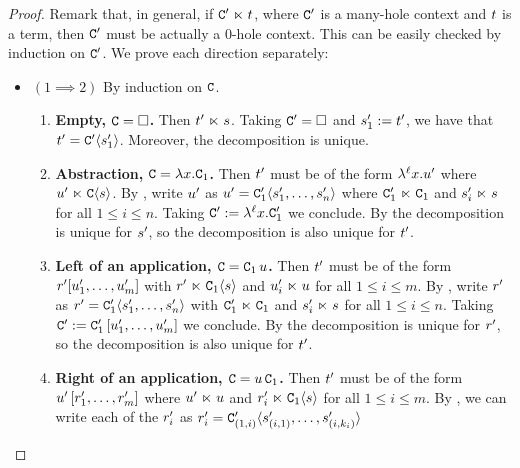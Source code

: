 \begin{proof}
Remark that, in general, if $\mathtt{C}' \mathrel{\ltimes} t$, where $\mathtt{C}'$ is a many-hole context and $t$ is a term,
then $\mathtt{C}'$ must be actually a $0$-hole context. This can be easily checked by induction on $\mathtt{C}'$.
We prove each direction separately:
\begin{itemize}
\item $(1 \implies 2)$
  By induction on $\mathtt{C}$.
  \begin{enumerate}
  \item {\bf Empty, $\mathtt{C} = \Box$.}
    Then $t' \mathrel{\ltimes} s$.
    Taking $\mathtt{C}' = \Box$ and $s'_1 := t'$,
    we have that $t' = \mathtt{C}'\langle s'_1\rangle$.
    Moreover, the decomposition is unique.
  \item {\bf Abstraction, $\mathtt{C} = \lambda x. \mathtt{C}_1$.}
    Then $t'$ must be of the form $\lambda^{\ell} x. u'$
    where $u' \mathrel{\ltimes} \mathtt{C}\langle s\rangle$.
    By \ih, write $u'$ as $u' = \mathtt{C}'_1\langle s'_1,\hdots,s'_n\rangle$
    where $\mathtt{C}'_1 \mathrel{\ltimes} \mathtt{C}_1$ and $s'_i \mathrel{\ltimes} s$ for all $1 \leq i \leq n$.
    Taking $\mathtt{C}' := \lambda^{\ell} x. \mathtt{C}'_1$ we conclude.
    By \ih the decomposition is unique for $s'$, so the decomposition is also unique for $t'$.
  \item {\bf Left of an application, $\mathtt{C} = \mathtt{C}_1\,u$.}
    Then $t'$ must be of the form $r'[u'_1,\hdots,u'_m]$
    with $r' \mathrel{\ltimes} \mathtt{C}_1\langle s\rangle$
    and $u'_i \mathrel{\ltimes} u$ for all $1 \leq i \leq m$.
    By \ih, write $r'$ as $r' = \mathtt{C}'_1\langle s'_1,\hdots,s'_n\rangle$
    with $\mathtt{C}'_1 \mathrel{\ltimes} \mathtt{C}_1$ and $s'_i \mathrel{\ltimes} s$ for all $1 \leq i \leq n$.
    Taking $\mathtt{C}' := \mathtt{C}'_1\,[u'_1,\hdots,u'_m]$ we conclude.
    By \ih the decomposition is unique for $r'$, so the decomposition is also unique for $t'$.
  \item {\bf Right of an application, $\mathtt{C} = u\,\mathtt{C}_1$.}
    Then $t'$ must be of the form $u'\,[r'_1,\hdots,r'_m]$
    where $u' \mathrel{\ltimes} u$ and $r'_i \mathrel{\ltimes} \mathtt{C}_1\langle s\rangle$ for all $1 \leq i \leq m$.
    By \ih, we can write each of the $r'_i$ as $r'_i = \mathtt{C}'_{(1,i)}\langle s'_{(i,1)},\hdots,s'_{(i,k_i)}\rangle$

\end{enumerate}
\end{itemize}
\end{proof}
